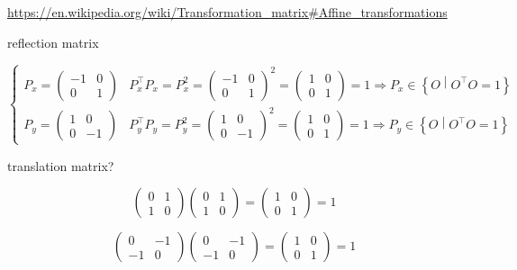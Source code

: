 \documentclass[
]{book}
\theoremstyle{definition}
\theoremstyle{definition}
\theoremstyle{definition}
\theoremstyle{definition}
\theoremstyle{remark}
\begin{document}
\url{https://en.wikipedia.org/wiki/Transformation_matrix\#Affine_transformations}

reflection matrix

\[
\begin{cases}
P_{{\scriptscriptstyle x}}=\begin{pmatrix}-1 & 0\\
0 & 1
\end{pmatrix} & P_{{\scriptscriptstyle x}}^{\intercal}P_{{\scriptscriptstyle x}}=P_{{\scriptscriptstyle x}}^{2}=\begin{pmatrix}-1 & 0\\
0 & 1
\end{pmatrix}^{2}=\begin{pmatrix}1 & 0\\
0 & 1
\end{pmatrix}=1\Rightarrow P_{{\scriptscriptstyle x}}\in\left\{ O\middle|O^{\intercal}O=1\right\} \\
P_{{\scriptscriptstyle y}}=\begin{pmatrix}1 & 0\\
0 & -1
\end{pmatrix} & P_{{\scriptscriptstyle y}}^{\intercal}P_{{\scriptscriptstyle y}}=P_{{\scriptscriptstyle y}}^{2}=\begin{pmatrix}1 & 0\\
0 & -1
\end{pmatrix}^{2}=\begin{pmatrix}1 & 0\\
0 & 1
\end{pmatrix}=1\Rightarrow P_{{\scriptscriptstyle y}}\in\left\{ O\middle|O^{\intercal}O=1\right\} 
\end{cases}
\]

translation matrix?

\[
\begin{pmatrix}0 & 1\\
1 & 0
\end{pmatrix}\begin{pmatrix}0 & 1\\
1 & 0
\end{pmatrix}=\begin{pmatrix}1 & 0\\
0 & 1
\end{pmatrix}=1
\]

\[
\begin{pmatrix}0 & -1\\
-1 & 0
\end{pmatrix}\begin{pmatrix}0 & -1\\
-1 & 0
\end{pmatrix}=\begin{pmatrix}1 & 0\\
0 & 1
\end{pmatrix}=1
\]
\end{document}
